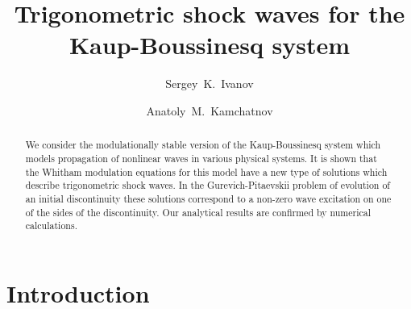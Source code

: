 \documentclass[pre,aps,superscriptaddress,twocolumn,floatfix]{revtex4-1}
\begin{document}
	
	\title{Trigonometric shock waves for the Kaup-Boussinesq system}
	
	
	\author{Sergey~K.~Ivanov}
	
	\author{Anatoly~M.~Kamchatnov}


\begin{abstract}
We consider the modulationally stable version of the Kaup-Boussinesq system
which models propagation of nonlinear waves in various physical systems. It is shown that the Whitham
modulation equations for this model have a new type of solutions which describe
trigonometric shock waves. In the Gurevich-Pitaevskii problem of evolution of an
initial discontinuity these solutions correspond to a non-zero wave excitation on
one of the sides of the discontinuity. Our analytical results are confirmed by
numerical calculations.
\end{abstract}

	
	\maketitle
	
\section{Introduction}\label{sec.introduction}
\end{document}
